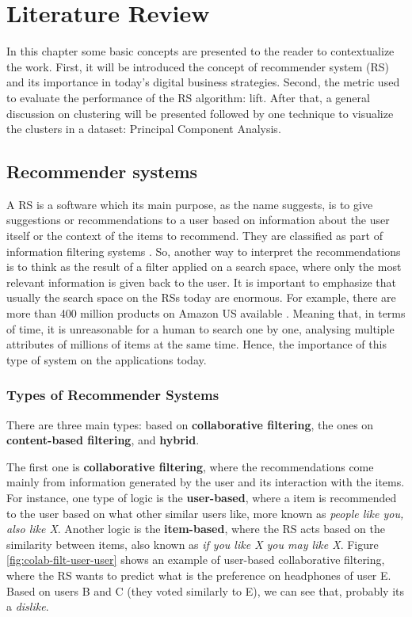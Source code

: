 \newcommand{\ASKA}{$\text{ASK}^0$}
\newcommand{\ASKS}{$\text{ASK}^*$}

\chapter{Literature Review}

In this chapter some basic concepts are presented to the reader to contextualize the work. First, it will be introduced the concept of recommender system (RS) and its importance in today's digital business strategies. Second, the metric used to evaluate the performance of the RS algorithm: lift. After that, a general discussion on clustering will be presented followed by one technique to visualize the clusters in a dataset: Principal Component Analysis.

\section{Recommender systems}

A RS is a software which its main purpose, as the name suggests, is to give suggestions \cite{ricci2011introduction} or recommendations to a user based on information about the user itself or the context of the items to recommend. They are classified as part of information filtering systems \cite{RecommendersystemWikipedia}. So, another way to interpret the recommendations is to think as the result of a filter applied on a search space, where only the most relevant information is given back to the user. It is important to emphasize that usually the search space on the RSs today are enormous. For example, there are more than 400 million products on Amazon US available \cite{amazon-number-of-products-2015}. Meaning that, in terms of time, it is unreasonable for a human to search one by one, analysing multiple attributes of millions of items at the same time. Hence, the importance of this type of system on the applications today.

\subsection{Types of Recommender Systems}

There are three main types: based on \textbf{collaborative filtering}, the ones on \textbf{content-based filtering}, and \textbf{hybrid}. 

The first one is \textbf{collaborative filtering}, where the recommendations come mainly from information generated by the user and its interaction with the items. For instance, one type of logic is the \textbf{user-based}, where a item is recommended to the user based on what other similar users like, more known as \textit{people like you, also like X}. Another logic is the \textbf{item-based}, where the RS acts based on the similarity between items, also known as \textit{if you like X you may like X}. Figure \ref{fig:colab-filt-user-user} shows an example of user-based collaborative filtering, where the RS wants to predict what is the preference on headphones of user E. Based on users B and C (they voted similarly to E), we can see that, probably its a \textit{dislike}.

